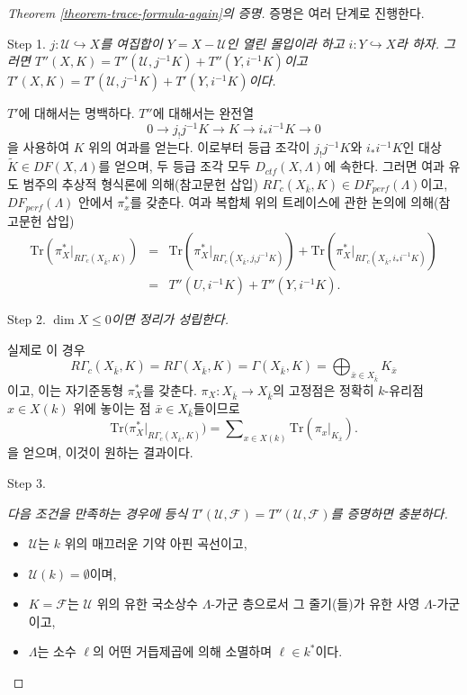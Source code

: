 \begin{proof}[Theorem \ref{theorem-trace-formula-again}의 증명]
증명은 여러 단계로 진행한다.

\medskip\noindent
Step 1. {\it $j : \mathcal{U}\hookrightarrow X$를 여집합이
$Y = X - \mathcal{U}$인 열린 몰입이라 하고
$i : Y \hookrightarrow X$라 하자. 그러면
$T''(X, K) = T''(\mathcal{U}, j^{-1} K)+ T''(Y, i^{-1}K)$이고
$T'(X, K) = T'(\mathcal{U}, j^{-1} K)+ T'(Y, i^{-1}K)$이다.}

\medskip\noindent
$T'$에 대해서는 명백하다. $T''$에 대해서는 완전열
$$
0\to j_!j^{-1} K \to K \to i_* i^{-1} K \to 0
$$
을 사용하여 $K$ 위의 여과를 얻는다. 이로부터
등급 조각이 $j_!j^{-1}K$와 $i_*i^{-1}K$인 대상
$\widetilde K \in DF(X, \Lambda)$를 얻으며, 두 등급 조각 모두
$D_{ctf}(X, \Lambda)$에 속한다. 그러면 여과 유도 범주의 추상적
형식론에 의해(참고문헌 삽입)
$R\Gamma_c(X_{\bar k}, K)\in DF_{perf}(\Lambda)$이고,
$DF_{perf}(\Lambda)$ 안에서 $\pi_x^*$를 갖춘다.
여과 복합체 위의 트레이스에 관한 논의에 의해(참고문헌 삽입)
\begin{eqnarray*}
\text{Tr}(\pi_X^* |_{R\Gamma_c(X_{\bar k}, K)})
& = & \text{Tr}(\pi_X^* |_{R\Gamma_c(X_{\bar k}, j_!j^{-1}K)}) +
\text{Tr}(\pi_X^* |_{R\Gamma_c(X_{\bar k}, i_*i^{-1}K)}) \\
& = & T''(U, i^{-1}K) + T''(Y, i^{-1}K).
\end{eqnarray*}

\noindent
Step 2. {\it $\dim X\leq 0$이면 정리가 성립한다.}

\medskip\noindent
실제로 이 경우
$$
R\Gamma_c(X_{\bar k}, K) = R\Gamma(X_{\bar k}, K) = \Gamma(X_{\bar k}, K) =
\bigoplus\nolimits_{\bar x \in X_{\bar k}} K_{\bar x}
$$
이고, 이는 자기준동형 $\pi_X^*$를 갖춘다.
$\pi_X : X_{\bar k}\to X_{\bar k}$의 고정점은 정확히
$k$-유리점 $x \in X(k)$ 위에 놓이는 점
$\bar x \in X_{\bar k}$들이므로
$$
\text{Tr}\big(\pi_X^*|_{R\Gamma_c(X_{\bar k}, K)}\big) =
\sum\nolimits_{x \in X(k)} \text{Tr}(\pi_x|_{K_{\bar x}}).
$$
을 얻으며, 이것이 원하는 결과이다.

\medskip\noindent
Step 3. {\it 다음 조건을 만족하는 경우에 등식
$T'(\mathcal{U}, \mathcal{F}) = T''(\mathcal{U}, \mathcal{F})$를
증명하면 충분하다.
\begin{itemize}
\item $\mathcal{U}$는 $k$ 위의 매끄러운 기약 아핀 곡선이고,
\item $\mathcal{U}(k) = \emptyset$이며,
\item $K=\mathcal{F}$는 $\mathcal{U}$ 위의 유한 국소상수
$\Lambda$-가군 층으로서 그 줄기(들)가 유한 사영
$\Lambda$-가군이고,
\item $\Lambda$는 소수 $\ell$의 어떤 거듭제곱에 의해 소멸하며
$\ell \in k^*$이다.
\end{itemize}
}


\end{proof}
